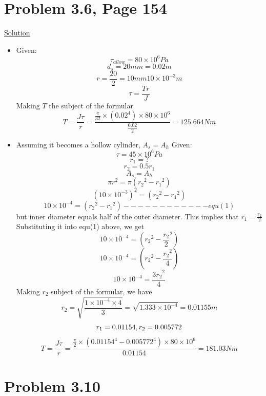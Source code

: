 \documentclass{article}
\begin{document}
\section*{Problem 3.6, Page 154}
\begin{center}\underline{Solution}\end{center}
\begin{itemize}
\item 
 Given: \[\tau_{allow} = 80 \times 10^{6}Pa\]\[d_{s} = 20mm = 0.02m\]\[r = \frac{20}{2} = 10mm 10\times10^{-3}m\]
\[\tau = \frac{{T}{r}}{J}\]
Making $ T$ the subject of the formular
\[T = \frac{J\tau}{r} = \frac{{\frac{\pi}{32}}\times(0.02^{4})\times 80 \times 10^{6}}{\frac{0.02}{2}} = 125.664Nm\]
\item Assuming it becomes a hollow cylinder, $A_{s} = A_{h}$\newline
Given: \[\tau = 45 \times 10^{6}Pa\]\[r_{1} = ?\]\[r_{2} = 0.5r_{1}\]
\[ A_{s} = A_{h}\]\[\pi r^{2} = \pi({r_{2}}^{2} - {r_{1}}^{2})\]\[(10\times10^{-3})^{2} = ({r_{2}}^{2} - {r_{1}}^{2})\]
\[10\times10^{-4} = ({r_{2}}^{2} - {r_{1}}^{2}) ------------ equ(1)\]
but inner diameter equals half of the outer diameter. This implies that $r_{1} = \frac{r_{2}}{2}$
Substituting it into equ(1) above, we get
\[10\times10^{-4} = ({r_{2}}^{2} - {\frac{{r_{2}}}{2}}^{2})\]
\[10\times10^{-4} = ({r_{2}}^{2} - \frac{{r_{2}}^{2}}{4})\]
\[10\times10^{-4} = \frac{{3r_{2}}^{2}}{4}\]
Making $ {r_{2}} $ subject of the formular, we have
\[r_{2} =\sqrt{ \frac{1\times10^{-4}\times4}{3}} = \sqrt{1.333\times10^{-4}} = 0.01155m\]
\[r_{1} = 0.01154 \space \space \space , r_{2} = 0.005772\]
\[T = \frac{J\tau}{r} = \frac{{\frac{\pi}{2}}\times(0.01154^{4} - 0.005772^{4})\times 80 \times 10^{6}}{0.01154} = 181.03Nm\]
\end{itemize}


\section*{Problem 3.10}
\end{document}
